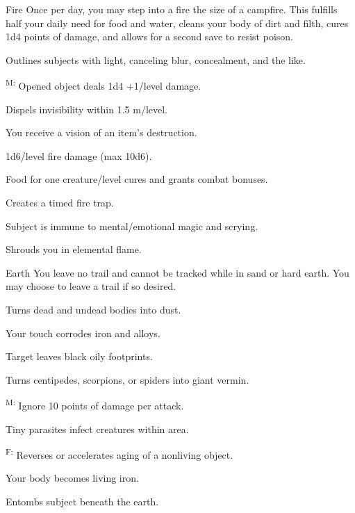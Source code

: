 {Fire}
{Once per day, you may step into a fire the size of a campfire. This fulfills half your daily need for food and water, cleans your body of dirt and filth, cures 1d4 points of damage, and allows for a second save to resist poison.}
{
	\item {} Outlines subjects with light, canceling blur, concealment, and the like.
	\item {}\textsuperscript{M:} Opened object deals 1d4 +1/level damage.
	\item {} Dispels invisibility within 1.5 m/level.
	\item {} You receive a vision of an item's destruction.
	\item {} 1d6/level fire damage (max 10d6).
	\item {} Food for one creature/level cures and grants combat bonuses.
	\item {} Creates a timed fire trap.
	\item {} Subject is immune to mental/emotional magic and scrying.
	\item {} Shrouds you in elemental flame.
}

{Earth}
{You leave no trail and cannot be tracked while in sand or hard earth. You may choose to leave a trail if so desired.}
{
	\item {} Turns dead and undead bodies into dust.
	\item {} Your touch corrodes iron and alloys.
	\item {} Target leaves black oily footprints.
	\item {} Turns centipedes, scorpions, or spiders into giant vermin.
	\item {}\textsuperscript{M:} Ignore 10 points of damage per attack.
	\item {} Tiny parasites infect creatures within area.
	\item {}\textsuperscript{F:} Reverses or accelerates aging of a nonliving object.
	\item {} Your body becomes living iron.
	\item {} Entombs subject beneath the earth.
}

